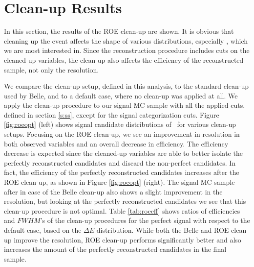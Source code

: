 \section{Clean-up Results}

In this section, the results of the ROE clean-up are shown. It is obvious that cleaning up the event affects the shape of various distributions, especially \vars, which we are most interested in. Since the reconstruction procedure includes cuts on the cleaned-up variables, the clean-up also affects the efficiency of the reconstructed sample, not only the resolution. 

We compare the clean-up setup, defined in this analysis, to the standard clean-up used by Belle, and to a default case, where no clean-up was applied at all. We apply the clean-up procedure to our signal MC sample with all the applied cuts, defined in section \ref{s:ss}, except for the signal categorization cuts. Figure \ref{fig:roeopt} (left) shows signal candidate distributions of \vars~for various clean-up setups. Focusing on the ROE clean-up, we see an improvement in resolution in both observed variables and an overall decrease in efficiency. The efficiency decrease is expected since the cleaned-up variables are able to better isolate the perfectly reconstructed candidates and discard the non-perfect candidates. In fact, the efficiency of the perfectly reconstructed candidates increases after the ROE clean-up, as shown in Figure \ref{fig:roeopt} (right). The signal MC sample after in case of the Belle clean-up also shows a slight improvement in the resolution, but looking at the perfectly reconstructed candidates we see that this clean-up procedure is not optimal. Table \ref{tab:roeeff} shows ratios of efficiencies and $FWHM$'s of the clean-up procedures for the perfect signal with respect to the default case, based on the $\Delta E$ distribution. While both the Belle and ROE clean-up improve the resolution, ROE clean-up performs significantly better and also increases the amount of the perfectly reconstructed candidates in the final sample.

